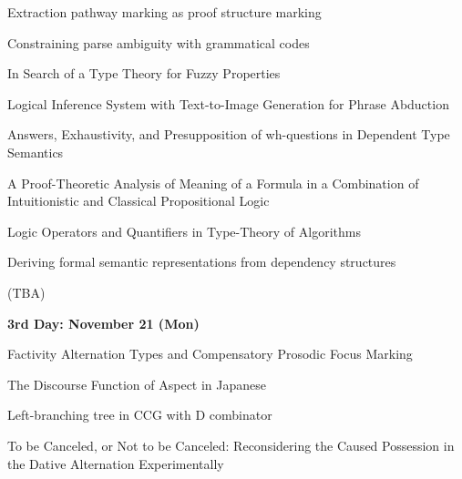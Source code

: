 \documentclass[12pt]{jarticle}
\begin{document}
      {Extraction pathway marking as proof structure marking}
      {}
  
      {Constraining parse ambiguity with grammatical codes}
      {}




  
      {In Search of a Type Theory for Fuzzy Properties}
      {}
  
      {Logical Inference System with Text-to-Image Generation for Phrase Abduction}
      {}
  
      {Answers, Exhaustivity, and Presupposition of wh-questions in Dependent Type Semantics}
      {}




  
      {A Proof-Theoretic Analysis of Meaning of a Formula in a Combination of Intuitionistic and Classical Propositional Logic}
      {}
  
      {Logic Operators and Quantifiers in Type-Theory of Algorithms}
      {}
  
      {Deriving formal semantic representations from dependency structures}
      {}




  
      {(TBA)}
      {}




\noindent\textbf{\large 
3rd Day: November 21 (Mon)
}\\




  
      {Factivity Alternation Types and Compensatory Prosodic Focus Marking}
      {}
  
      {The Discourse Function of Aspect in Japanese}
      {}
  
      {Left-branching tree in CCG with D combinator}
      {}




  
      {To be Canceled, or Not to be Canceled: Reconsidering the Caused Possession in the Dative Alternation Experimentally}
      {}
  
\end{document}

